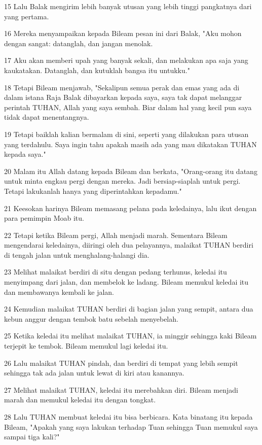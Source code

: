 \par 15 Lalu Balak mengirim lebih banyak utusan yang lebih tinggi pangkatnya dari yang pertama.
\par 16 Mereka menyampaikan kepada Bileam pesan ini dari Balak, "Aku mohon dengan sangat: datanglah, dan jangan menolak.
\par 17 Aku akan memberi upah yang banyak sekali, dan melakukan apa saja yang kaukatakan. Datanglah, dan kutuklah bangsa itu untukku."
\par 18 Tetapi Bileam menjawab, "Sekalipun semua perak dan emas yang ada di dalam istana Raja Balak dibayarkan kepada saya, saya tak dapat melanggar perintah TUHAN, Allah yang saya sembah. Biar dalam hal yang kecil pun saya tidak dapat menentangnya.
\par 19 Tetapi baiklah kalian bermalam di sini, seperti yang dilakukan para utusan yang terdahulu. Saya ingin tahu apakah masih ada yang mau dikatakan TUHAN kepada saya."
\par 20 Malam itu Allah datang kepada Bileam dan berkata, "Orang-orang itu datang untuk minta engkau pergi dengan mereka. Jadi bersiap-siaplah untuk pergi. Tetapi lakukanlah hanya yang diperintahkan kepadamu."
\par 21 Keesokan harinya Bileam memasang pelana pada keledainya, lalu ikut dengan para pemimpin Moab itu.
\par 22 Tetapi ketika Bileam pergi, Allah menjadi marah. Sementara Bileam mengendarai keledainya, diiringi oleh dua pelayannya, malaikat TUHAN berdiri di tengah jalan untuk menghalang-halangi dia.
\par 23 Melihat malaikat berdiri di situ dengan pedang terhunus, keledai itu menyimpang dari jalan, dan membelok ke ladang. Bileam memukul keledai itu dan membawanya kembali ke jalan.
\par 24 Kemudian malaikat TUHAN berdiri di bagian jalan yang sempit, antara dua kebun anggur dengan tembok batu sebelah menyebelah.
\par 25 Ketika keledai itu melihat malaikat TUHAN, ia minggir sehingga kaki Bileam terjepit ke tembok. Bileam memukul lagi keledai itu.
\par 26 Lalu malaikat TUHAN pindah, dan berdiri di tempat yang lebih sempit sehingga tak ada jalan untuk lewat di kiri atau kanannya.
\par 27 Melihat malaikat TUHAN, keledai itu merebahkan diri. Bileam menjadi marah dan memukul keledai itu dengan tongkat.
\par 28 Lalu TUHAN membuat keledai itu bisa berbicara. Kata binatang itu kepada Bileam, "Apakah yang saya lakukan terhadap Tuan sehingga Tuan memukul saya sampai tiga kali?"
